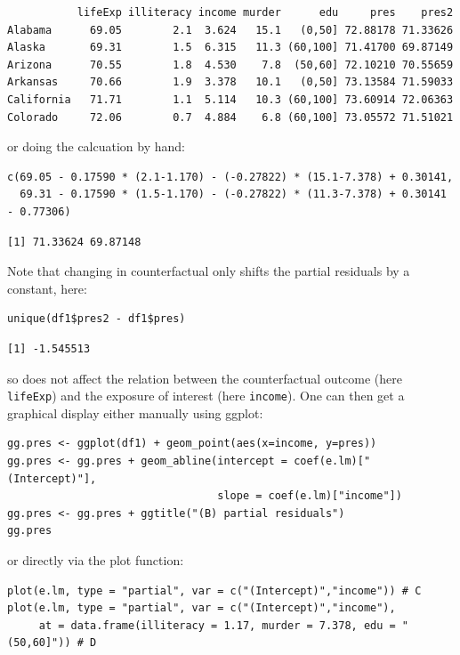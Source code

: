 \documentclass[12pt]{article}
\begin{document}
\begin{verbatim}
           lifeExp illiteracy income murder      edu     pres    pres2
Alabama      69.05        2.1  3.624   15.1   (0,50] 72.88178 71.33626
Alaska       69.31        1.5  6.315   11.3 (60,100] 71.41700 69.87149
Arizona      70.55        1.8  4.530    7.8  (50,60] 72.10210 70.55659
Arkansas     70.66        1.9  3.378   10.1   (0,50] 73.13584 71.59033
California   71.71        1.1  5.114   10.3 (60,100] 73.60914 72.06363
Colorado     72.06        0.7  4.884    6.8 (60,100] 73.05572 71.51021
\end{verbatim}


or doing the calcuation by hand:
\lstset{language=r,label= ,caption= ,captionpos=b,numbers=none}
\begin{lstlisting}
c(69.05 - 0.17590 * (2.1-1.170) - (-0.27822) * (15.1-7.378) + 0.30141,
  69.31 - 0.17590 * (1.5-1.170) - (-0.27822) * (11.3-7.378) + 0.30141 - 0.77306)
\end{lstlisting}

\begin{verbatim}
[1] 71.33624 69.87148
\end{verbatim}


Note that changing in counterfactual only shifts the partial residuals
by a constant, here:
\lstset{language=r,label= ,caption= ,captionpos=b,numbers=none}
\begin{lstlisting}
unique(df1$pres2 - df1$pres)
\end{lstlisting}

\begin{verbatim}
[1] -1.545513
\end{verbatim}


so does not affect the relation between the counterfactual outcome
(here \texttt{lifeExp}) and the exposure of interest (here \texttt{income}). One can
then get a graphical display either manually using ggplot:
\lstset{language=r,label= ,caption= ,captionpos=b,numbers=none}
\begin{lstlisting}
gg.pres <- ggplot(df1) + geom_point(aes(x=income, y=pres))
gg.pres <- gg.pres + geom_abline(intercept = coef(e.lm)["(Intercept)"],
                                 slope = coef(e.lm)["income"])
gg.pres <- gg.pres + ggtitle("(B) partial residuals")
gg.pres
\end{lstlisting}

or directly via the plot function:
\lstset{language=r,label= ,caption= ,captionpos=b,numbers=none}
\begin{lstlisting}
plot(e.lm, type = "partial", var = c("(Intercept)","income")) # C
plot(e.lm, type = "partial", var = c("(Intercept)","income"),
     at = data.frame(illiteracy = 1.17, murder = 7.378, edu = "(50,60]")) # D
\end{lstlisting}
\end{document}
